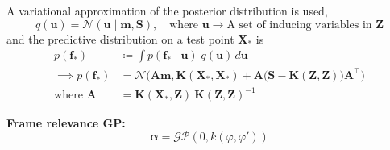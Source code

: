 A variational approximation of the posterior distribution is used,
\begin{equation}
    q(\boldsymbol{u}) = \mathcal{N}(\boldsymbol{u} \mid \boldsymbol{m}, \boldsymbol{S}), \quad \text{where } \boldsymbol{u} \to \text{A set of inducing variables in } \boldsymbol{Z}
\end{equation}
and the predictive distribution on a test point \( \boldsymbol{X}_* \) is
\begin{align}
    p(\boldsymbol{f}_*)
     & \coloneq
    \int p(\boldsymbol{f}_* \mid \boldsymbol{u}) \; q(\boldsymbol{u}) \, d\boldsymbol{u}
    \\
    \implies
    p(\boldsymbol{f}_*)
     & =
    \mathcal{N} \Big( \boldsymbol{A} \boldsymbol{m}, \boldsymbol{K}(\boldsymbol{X}_*, \boldsymbol{X}_*) + \boldsymbol{A} \big( \boldsymbol{S} - \boldsymbol{K}(\boldsymbol{Z}, \boldsymbol{Z}) \big) \boldsymbol{A}^\top \Big)
    \\
    \text{where }
    \boldsymbol{A}
     & =
    \boldsymbol{K}(\boldsymbol{X}_*, \boldsymbol{Z}) \ {\boldsymbol{K}(\boldsymbol{Z}, \boldsymbol{Z})}^{-1}
\end{align}

\textbf{Frame relevance GP:}
\begin{equation}
    \boldsymbol{\alpha} = \mathcal{GP}(0, k(\varphi, \varphi'))
\end{equation}
